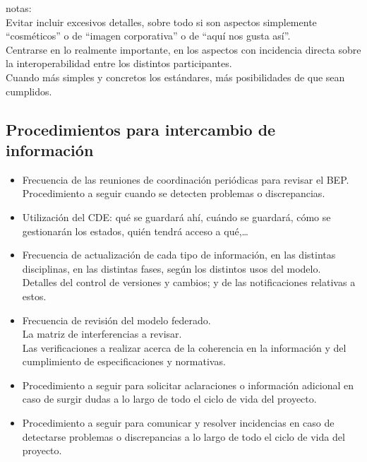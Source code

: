 \documentclass[spanish,12pt,a4paper,final,oneside]{book}
\begin{document}
notas: 
\\Evitar incluir excesivos detalles, sobre todo si son aspectos simplemente ``cosméticos'' o de ``imagen corporativa'' o de ``aquí nos gusta así''. 
\\Centrarse en lo realmente importante, en los aspectos con incidencia directa sobre la interoperabilidad entre los distintos participantes. 
\\Cuando más simples y concretos los estándares, más posibilidades de que sean cumplidos.

\subsection{Procedimientos para intercambio de información}
\begin{itemize}

\item Frecuencia de las reuniones de coordinación periódicas para revisar el BEP.
\\Procedimiento a seguir cuando se detecten problemas o discrepancias.

\item Utilización del CDE: qué se guardará ahí, cuándo se guardará, cómo se gestionarán los estados, quién tendrá acceso a qué,\ldots

\item Frecuencia de actualización de cada tipo de información, en las distintas disciplinas, en las distintas fases, según los distintos usos del modelo.
\\Detalles del control de versiones y cambios; y de las notificaciones relativas a estos.

\item Frecuencia de revisión del modelo federado.
\\La matriz de interferencias a revisar.
\\Las verificaciones a realizar acerca de la coherencia en la información y del cumplimiento de especificaciones y normativas.

\item Procedimiento a seguir para solicitar aclaraciones o información adicional en caso de surgir dudas a lo largo de todo el ciclo de vida del proyecto.

\item Procedimiento a seguir para comunicar y resolver incidencias en caso de detectarse problemas o discrepancias a lo largo de todo el ciclo de vida del proyecto.

\end{itemize}
\end{document}
